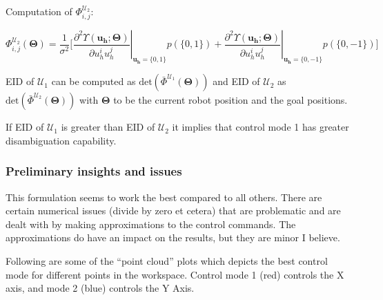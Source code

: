 \documentclass[]{article}
\begin{document}
\noindent Computation of $\Phi^{\mathcal{U}_2}_{i,j}$:

\begin{equation*}
\Phi^{\mathcal{U}_2}_{i,j}(\boldsymbol{\Theta}) = \frac{1}{\sigma^2}\Big[^{}\left.\frac{\partial^2\Upsilon(\boldsymbol{u_h}; \boldsymbol{\Theta})}{\partial u_h^iu_h^j}\right\vert_{\boldsymbol{u_h} = \{0,1\}}p(\{0,1\}) + \left.\frac{\partial^2\Upsilon(\boldsymbol{u_h}; \boldsymbol{\Theta})}{\partial u_h^iu_h^j}\right\vert_{\boldsymbol{u_h} = \{0,-1\}}p(\{0,-1\})\Big]
\end{equation*}

EID of $\mathcal{U}_1$ can be computed as $\text{det}(\bar{\Phi}^{\mathcal{U}_1}(\boldsymbol{\Theta}))$ and EID of $\mathcal{U}_2$ as $\text{det}(\bar{\Phi}^{\mathcal{U}_2}(\boldsymbol{\Theta}))$ with $\boldsymbol{\Theta}$ to be the current robot position and the goal positions. 	

If EID of $\mathcal{U}_1$ is greater than EID of $\mathcal{U}_2$ it implies that control mode 1 has greater disambiguation capability. 

\subsubsection*{Preliminary insights and issues}

This formulation seems to work the best compared to all others. There are certain numerical issues (divide by zero et cetera) that are problematic and are dealt with by making approximations to the control commands. The approximations do have an impact on the results, but they are minor I believe.  

Following are some of the ``point cloud'' plots which depicts the best control mode for different points in the workspace. Control mode 1 (red) controls the X axis, and mode 2 (blue) controls the Y Axis. 
\end{document}
